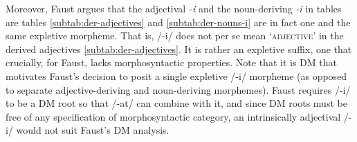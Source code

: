 Moreover, Faust argues that the adjectival \textit{-i} and 
the noun-deriving \textit{-i} in tables are tables 
\ref{subtab:der-adjectives} and \ref{subtab:der-nouns-i} 
are in fact one and the same expletive morpheme. That is, 
/-i/ does not per se mean `\textsc{adjective}' in the derived adjectives 
\ref{subtab:der-adjectives}. It is rather an expletive suffix, one that 
crucially, for Faust, lacks morphosyntactic properties.
Note that it is \ac{DM} that motivates Faust's decision to posit a single 
expletive /-i/ morpheme (as opposed to 
separate adjective-deriving and noun-deriving morphemes).  Faust 
requires /-i/ to be a \ac{DM} root so that /-at/ can combine with it, and since 
\ac{DM} roots must be free of any specification of morphosyntactic 
category, an intrinsically adjectival /-i/ would
not suit Faust's \ac{DM} analysis. 

